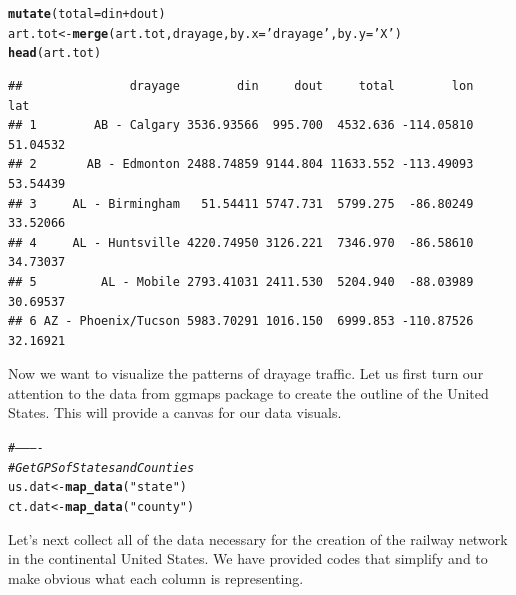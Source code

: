 \documentclass{article}\usepackage[]{graphicx}\usepackage[]{color}
\makeatletter
\newcommand{\hlstr}[1]{\textcolor[rgb]{0.192,0.494,0.8}{#1}}%
\newcommand{\hlcom}[1]{\textcolor[rgb]{0.678,0.584,0.686}{\textit{#1}}}%
\newcommand{\hlopt}[1]{\textcolor[rgb]{0,0,0}{#1}}%
\newcommand{\hlstd}[1]{\textcolor[rgb]{0.345,0.345,0.345}{#1}}%
\newcommand{\hlkwb}[1]{\textcolor[rgb]{0.69,0.353,0.396}{#1}}%
\newcommand{\hlkwc}[1]{\textcolor[rgb]{0.333,0.667,0.333}{#1}}%
\newcommand{\hlkwd}[1]{\textcolor[rgb]{0.737,0.353,0.396}{\textbf{#1}}}%
\newenvironment{kframe}{%
 \def\at@end@of@kframe{}%
 \ifinner\ifhmode%
  \def\at@end@of@kframe{\end{minipage}}%
  \begin{minipage}{\columnwidth}%
 \fi\fi%
 \def\FrameCommand##1{\hskip\@totalleftmargin \hskip-\fboxsep
 \colorbox{shadecolor}{##1}\hskip-\fboxsep
     \hskip-\linewidth \hskip-\@totalleftmargin \hskip\columnwidth}%
 \MakeFramed {\advance\hsize-\width
   \@totalleftmargin\z@ \linewidth\hsize
   \@setminipage}}%
 {\par\unskip\endMakeFramed%
 \at@end@of@kframe}
\newenvironment{knitrout}{}{} %
\makeatother
\begin{document}
\begin{knitrout}
\begin{kframe}
\begin{alltt}
  \hlkwd{mutate}\hlstd{(}\hlkwc{total} \hlstd{= din} \hlopt{+} \hlstd{dout)}
\hlstd{art.tot} \hlkwb{<-} \hlkwd{merge}\hlstd{(art.tot, drayage,} \hlkwc{by.x} \hlstd{=} \hlstr{'drayage'}\hlstd{,} \hlkwc{by.y} \hlstd{=} \hlstr{'X'}\hlstd{)}
\hlkwd{head}\hlstd{(art.tot)}
\end{alltt}
\begin{verbatim}
##               drayage        din     dout     total        lon      lat
## 1        AB - Calgary 3536.93566  995.700  4532.636 -114.05810 51.04532
## 2       AB - Edmonton 2488.74859 9144.804 11633.552 -113.49093 53.54439
## 3     AL - Birmingham   51.54411 5747.731  5799.275  -86.80249 33.52066
## 4     AL - Huntsville 4220.74950 3126.221  7346.970  -86.58610 34.73037
## 5         AL - Mobile 2793.41031 2411.530  5204.940  -88.03989 30.69537
## 6 AZ - Phoenix/Tucson 5983.70291 1016.150  6999.853 -110.87526 32.16921
\end{verbatim}
\end{kframe}
\end{knitrout}

Now we want to visualize the patterns of drayage traffic. Let us first turn our attention to the data from ggmaps package to create the outline of the United States. This will provide a canvas for our data visuals.

\begin{knitrout}
\color{fgcolor}\begin{kframe}
\begin{alltt}
\hlcom{#----------}
\hlcom{# Get GPS of States and Counties}
\hlstd{us.dat} \hlkwb{<-} \hlkwd{map_data}\hlstd{(}\hlstr{"state"}\hlstd{)}
\hlstd{ct.dat} \hlkwb{<-} \hlkwd{map_data}\hlstd{(}\hlstr{"county"}\hlstd{)}
\end{alltt}
\end{kframe}
\end{knitrout}


Let's next collect all of the data necessary for the creation of the railway network in the continental United States. We have provided codes that simplify and to make obvious what each column is representing. 
\end{document}
